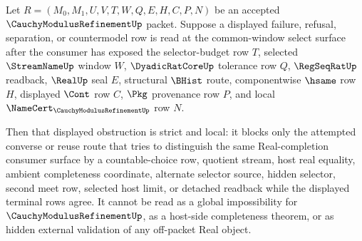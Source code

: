 \begin{corollary}
\label{cor:cauchy-modulus-refinement-common-window-select-strict-obstruction}
Let $R=(M_0,M_1,U,V,T,W,Q,E,H,C,P,N)$ be an accepted $\CauchyModulusRefinementUp$ packet. Suppose a displayed failure, refusal, separation, or countermodel row is read at the common-window select surface after the consumer has exposed the selector-budget row $T$, selected $\StreamNameUp$ window $W$, $\DyadicRatCoreUp$ tolerance row $Q$, $\RegSeqRatUp$ readback, $\RealUp$ seal $E$, structural $\BHist$ route, componentwise $\hsame$ row $H$, displayed $\Cont$ row $C$, $\Pkg$ provenance row $P$, and local $\NameCert_{\CauchyModulusRefinementUp}$ row $N$.

Then that displayed obstruction is strict and local: it blocks only the attempted converse or reuse route that tries to distinguish the same Real-completion consumer surface by a countable-choice row, quotient stream, host real equality, ambient completeness coordinate, alternate selector source, hidden selector, second meet row, selected host limit, or detached readback while the displayed terminal rows agree. It cannot be read as a global impossibility for $\CauchyModulusRefinementUp$, as a host-side completeness theorem, or as hidden external validation of any off-packet Real object.
\end{corollary}
